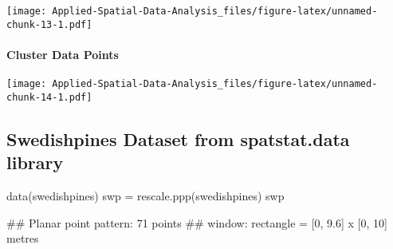 \documentclass[
]{book}
\newenvironment{Shaded}{\begin{snugshade}}{\end{snugshade}}
\newcommand{\AttributeTok}[1]{\textcolor[rgb]{0.77,0.63,0.00}{#1}}
\newcommand{\DecValTok}[1]{\textcolor[rgb]{0.00,0.00,0.81}{#1}}
\newcommand{\FunctionTok}[1]{\textcolor[rgb]{0.00,0.00,0.00}{#1}}
\newcommand{\NormalTok}[1]{#1}
\newcommand{\OtherTok}[1]{\textcolor[rgb]{0.56,0.35,0.01}{#1}}
\newcommand{\SpecialCharTok}[1]{\textcolor[rgb]{0.00,0.00,0.00}{#1}}
\newcommand{\StringTok}[1]{\textcolor[rgb]{0.31,0.60,0.02}{#1}}
\begin{document}
\texttt{[image: Applied-Spatial-Data-Analysis\_files/figure-latex/unnamed-chunk-13-1.pdf]}

\hypertarget{cluster-data-points}{%
\paragraph{Cluster Data Points}\label{cluster-data-points}}

\begin{Shaded}
\end{Shaded}

\texttt{[image: Applied-Spatial-Data-Analysis\_files/figure-latex/unnamed-chunk-14-1.pdf]}

\hypertarget{swedishpines-dataset-from-spatstat.data-library}{%
\subsection{Swedishpines Dataset from spatstat.data library}\label{swedishpines-dataset-from-spatstat.data-library}}

\begin{Shaded}
\begin{Highlighting}[]
\FunctionTok{data}\NormalTok{(swedishpines)}
\NormalTok{swp }\OtherTok{=} \FunctionTok{rescale.ppp}\NormalTok{(swedishpines)}
\NormalTok{swp}
\end{Highlighting}
\end{Shaded}

\begin{Shaded}
\begin{Highlighting}[]
\NormalTok{\#\# Planar point pattern: 71 points}
\NormalTok{\#\# window: rectangle = [0, 9.6] x [0, 10] metres}
\end{Highlighting}
\end{Shaded}
\end{document}
